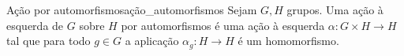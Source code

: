 \begin{definition}{Ação por automorfismos}{ação_automorfismos}
    Sejam \(G, H\) grupos. Uma ação à esquerda de \(G\) sobre \(H\) por automorfismos é uma ação à esquerda \(\alpha : G \times H \to H\) tal que para todo \(g \in G\) a aplicação \(\alpha_{g} : H \to H\) é um homomorfismo.
\end{definition}

